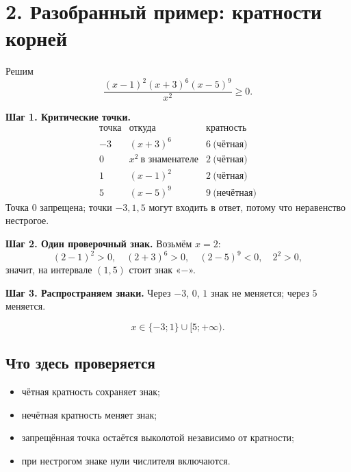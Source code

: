 \documentclass[a4paper,12pt]{article}
\begin{document}
\section*{2. Разобранный пример: кратности корней}
Решим
\[
\frac{(x-1)^2(x+3)^6(x-5)^9}{x^2}\ge0.
\]

\textbf{Шаг 1. Критические точки.}
\[
\begin{array}{c|c|c}
\text{точка} & \text{откуда} & \text{кратность}\\
\hline
-3 & (x+3)^6 & 6\ \text{(чётная)}\\
0 & x^2\ \text{в знаменателе} & 2\ \text{(чётная)}\\
1 & (x-1)^2 & 2\ \text{(чётная)}\\
5 & (x-5)^9 & 9\ \text{(нечётная)}
\end{array}
\]
Точка \(0\) запрещена; точки \(-3,1,5\) могут входить в ответ, потому что неравенство нестрогое.

\textbf{Шаг 2. Один проверочный знак.} Возьмём \(x=2\):
\[
(2-1)^2>0,\quad (2+3)^6>0,\quad (2-5)^9<0,\quad 2^2>0,
\]
значит, на интервале \((1,5)\) стоит знак «\(-\)».

\textbf{Шаг 3. Распространяем знаки.} Через \(-3\), \(0\), \(1\) знак не меняется; через \(5\) меняется.

\begin{center}
\end{center}

\[
\boxed{x\in\{-3;1\}\cup[5;+\infty)}.
\]

\subsection*{Что здесь проверяется}
\begin{itemize}
  \item чётная кратность сохраняет знак;
  \item нечётная кратность меняет знак;
  \item запрещённая точка остаётся выколотой независимо от кратности;
  \item при нестрогом знаке нули числителя включаются.
\end{itemize}
\end{document}

